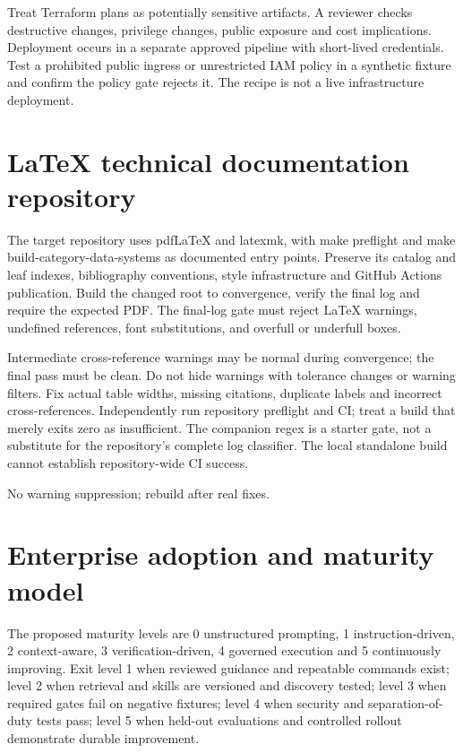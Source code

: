 \documentclass[11pt,letterpaper]{article}
\begin{document}
Treat Terraform plans as potentially sensitive artifacts. A reviewer checks destructive changes, privilege changes, public exposure and cost implications. Deployment occurs in a separate approved pipeline with short-lived credentials. Test a prohibited public ingress or unrestricted IAM policy in a synthetic fixture and confirm the policy gate rejects it. The recipe is not a live infrastructure deployment.

\section{LaTeX technical documentation repository}
The target repository uses pdfLaTeX and latexmk, with make preflight and make build-category-data-systems as documented entry points. Preserve its catalog and leaf indexes, bibliography conventions, style infrastructure and GitHub Actions publication. Build the changed root to convergence, verify the final log and require the expected PDF. The final-log gate must reject LaTeX warnings, undefined references, font substitutions, and overfull or underfull boxes.

Intermediate cross-reference warnings may be normal during convergence; the final pass must be clean. Do not hide warnings with tolerance changes or warning filters. Fix actual table widths, missing citations, duplicate labels and incorrect cross-references. Independently run repository preflight and CI; treat a build that merely exits zero as insufficient. The companion regex is a starter gate, not a substitute for the repository's complete log classifier. The local standalone build cannot establish repository-wide CI success.

\begin{center}\begin{minipage}{\linewidth}\captionsetup{type=figure}\centering{}\caption{LaTeX zero-warning verification workflow}
\small No warning suppression; rebuild after real fixes.\end{minipage}\end{center}
\section{Enterprise adoption and maturity model}
The proposed maturity levels are 0 unstructured prompting, 1 instruction-driven, 2 context-aware, 3 verification-driven, 4 governed execution and 5 continuously improving. Exit level 1 when reviewed guidance and repeatable commands exist; level 2 when retrieval and skills are versioned and discovery tested; level 3 when required gates fail on negative fixtures; level 4 when security and separation-of-duty tests pass; level 5 when held-out evaluations and controlled rollout demonstrate durable improvement.
\end{document}
